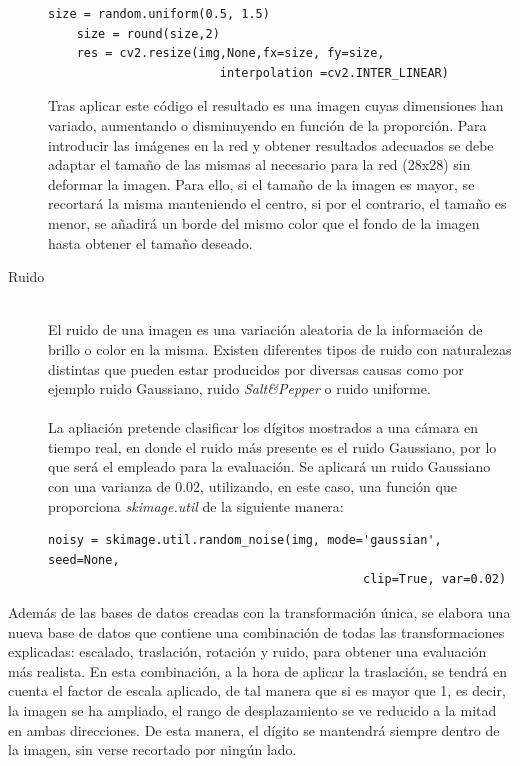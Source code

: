 \begin{description}
	\vspace{10pt}
	\begin{lstlisting}[frame=single]
	size = random.uniform(0.5, 1.5)
	size = round(size,2)
	res = cv2.resize(img,None,fx=size, fy=size, 
						interpolation =cv2.INTER_LINEAR)
	\end{lstlisting}
	Tras aplicar este código el resultado es una imagen cuyas dimensiones han variado, aumentando o disminuyendo en función de la proporción. Para introducir las imágenes en la red y obtener resultados adecuados se debe adaptar el tamaño de las mismas al necesario para la red (28x28) sin deformar la imagen. Para ello, si el tamaño de la imagen es mayor, se recortará la misma manteniendo el centro, si por el contrario, el tamaño es menor, se añadirá un borde del mismo color que el fondo de la imagen hasta obtener el tamaño deseado.
	
	\item[Ruido] \hfill 
	\vspace{10pt}
	\\
	El ruido de una imagen es una variación aleatoria de la información de brillo o color en la misma. Existen diferentes tipos de ruido con naturalezas distintas que pueden estar producidos por diversas causas como por ejemplo ruido Gaussiano, ruido \textit{Salt\&Pepper} o ruido uniforme.\\
	\vspace{-10pt}
	\\
	La apliación pretende clasificar los dígitos mostrados a una cámara en tiempo real, en donde el ruido más presente es el ruido Gaussiano, por lo que será el empleado para la evaluación. Se aplicará un ruido Gaussiano con  una varianza de 0.02, utilizando, en este caso, una función que proporciona \textit{skimage.util} de la siguiente manera:
	\vspace{10pt}
	\begin{lstlisting}[frame=single]
	noisy = skimage.util.random_noise(img, mode='gaussian', seed=None, 
											clip=True, var=0.02)
	\end{lstlisting}
\end{description}

Además de las bases de datos creadas con la transformación única, se elabora una nueva base de datos que contiene una combinación de todas las transformaciones explicadas: escalado, traslación, rotación y ruido, para obtener una evaluación más realista. En esta combinación, a la hora de aplicar la traslación, se tendrá en cuenta el factor de escala aplicado, de tal manera que si es mayor que 1, es decir, la imagen se ha ampliado, el rango de desplazamiento se ve reducido a la mitad en ambas direcciones. De esta manera, el dígito se mantendrá siempre dentro de la imagen, sin verse recortado por ningún lado.\\


